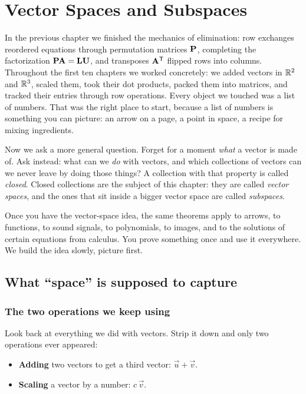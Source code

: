 \chapter{Vector Spaces and Subspaces}

In the previous chapter we finished the mechanics of elimination: row
exchanges reordered equations through permutation matrices $\mathbf{P}$, completing the
factorization $\mathbf{P}\mathbf{A}=\mathbf{L}\mathbf{U}$, and transposes
$\mathbf{A}^{\mathsf{T}}$ flipped rows into columns. Throughout the first ten chapters we worked concretely:
we added vectors in $\mathbb{R}^2$ and $\mathbb{R}^3$, scaled them, took their
dot products, packed them into matrices, and tracked their entries
through row operations. Every object we touched was a list of numbers. That was the right
place to start, because a list of numbers is something you can picture: an arrow on a
page, a point in space, a recipe for mixing ingredients.

Now we ask a more general question. Forget for a moment
\emph{what} a vector is made of. Ask instead: what can we \emph{do} with vectors, and
which collections of vectors can we never leave by doing those things? A collection with
that property is called \emph{closed}. Closed collections are the subject of this chapter:
they are called \emph{vector spaces}, and the ones that sit inside a bigger vector space
are called \emph{subspaces}.

Once you have the vector-space idea, the same theorems apply to
arrows, to functions, to sound signals, to polynomials, to images, and to the solutions of
certain equations from calculus. You prove something once and use it everywhere. We
build the idea slowly, picture first.

\chapterline

\section{What ``space'' is supposed to capture}

\subsection{The two operations we keep using}

Look back at everything we did with vectors. Strip it down and only two operations ever
appeared:

\begin{itemize}
  \item \textbf{Adding} two vectors to get a third vector: $\vec{u} + \vec{v}$.
  \item \textbf{Scaling} a vector by a number: $c\,\vec{v}$.
\end{itemize}

